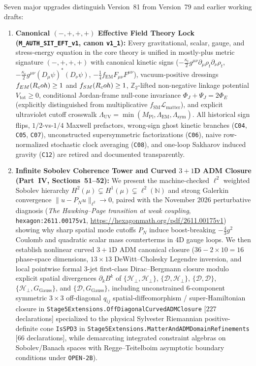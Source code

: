 Seven major upgrades distinguish Version~81 from Version~79 and earlier working drafts:
\begin{enumerate}[leftmargin=2em]
  \item \textbf{Canonical $(-,+,+,+)$ Effective Field Theory Lock (\texttt{M\_AUTH\_SIT\_EFT\_v1}, canon \texttt{v1\_1}):} Every gravitational, scalar, gauge, and stress-energy equation in the core theory is unified in mostly-plus metric signature $(-,+,+,+)$ with canonical kinetic signs ($-\frac{\kappa_t}{2}g^{\mu\nu}\partial_\mu\rho_t\partial_\nu\rho_t$, $-\frac{\kappa_c}{2}g^{\mu\nu}(D_\mu\psi)^*(D_\nu\psi)$, $-\frac{1}{4}f_{\mathrm{EM}}F_{\mu\nu}F^{\mu\nu}$), vacuum-positive dressings $f_{EM}(R_coh) \ge 1$ and $f_{SM}(R_coh) \ge 1$, $\mathbb{Z}_2$-lifted non-negative linkage potential $V_{\mathrm{tot}} \ge 0$, conditional Jordan-frame null-cone invariance $\Phi_J + \Psi_J = 2\Phi_E$ (explicitly distinguished from multiplicative $f_{\mathrm{SM}}\mathcal{L}_{\mathrm{matter}}$), and explicit ultraviolet cutoff crosswalk $\Lambda_{\mathrm{UV}} = \min(M_{\mathrm{Pl}}, \Lambda_{\mathrm{EM}}, \Lambda_{\mathrm{sym}})$. All historical sign flips, $1/2$-vs-$1/4$ Maxwell prefactors, wrong-sign ghost kinetic branches (\texttt{C04}, \texttt{C05}, \texttt{C07}), unconstructed supersymmetric factorizations (\texttt{C06}), naive row-normalized stochastic clock averaging (\texttt{C08}), and one-loop Sakharov induced gravity (\texttt{C12}) are retired and documented transparently.
  \item \textbf{Infinite Sobolev Coherence Tower and Curved $3+1$D ADM Closure (Part~IV, Sections~51--52):} We present the machine-checked $\ell^2$ weighted Sobolev hierarchy $H^2(\mu) \subsetneq H^1(\mu) \subsetneq \ell^2(\mathbb{N})$ and strong Galerkin convergence $\|u - P_N u\|_{\ell^2} \to 0$, paired with the November 2026 perturbative diagnosis (\emph{The Hawking--Page transition at weak coupling}, \texttt{hexagon:2611.00175v1}, \url{https://hexagonmath.org/pdf/2611.00175v1}) showing why sharp spatial mode cutoffs $P_N$ induce boost-breaking $-\frac{4}{3}g^2$ Coulomb and quadratic scalar mass counterterms in 4D gauge loops. We then establish nonlinear curved $3+1$D ADM canonical closure ($36 - 2\times 10 = 16$ phase-space dimensions, $13\times 13$ DeWitt--Cholesky Legendre inversion, and local pointwise formal 3-jet first-class Dirac--Bergmann closure modulo explicit spatial divergences $\partial_k B^k$ of $\{\mathcal{H}_\perp,\mathcal{H}_\perp\}$, $\{\mathcal{D},\mathcal{H}_\perp\}$, $\{\mathcal{D},\mathcal{D}\}$, $\{\mathcal{H}_\perp,G_{\mathrm{Gauss}}\}$, and $\{\mathcal{D},G_{\mathrm{Gauss}}\}$, including unconstrained 6-component symmetric $3\times 3$ off-diagonal $q_{ij}$ spatial-diffeomorphism / super-Hamiltonian closure in \texttt{Stage5\allowbreak{}Extensions.\allowbreak{}Off\allowbreak{}Diagonal\allowbreak{}Curved\allowbreak{}ADMClosure} [$227$ declarations] specialized to the physical Sylvester Riemannian positive-definite cone \texttt{IsSPD3} in \texttt{Stage5\allowbreak{}Extensions.\allowbreak{}Matter\allowbreak{}And\allowbreak{}ADMDomain\allowbreak{}Refinements} [$66$ declarations], while demarcating integrated constraint algebras on Sobolev/Banach spaces with Regge--Teitelboim asymptotic boundary conditions under \texttt{OPEN-2B}).

\end{enumerate}
